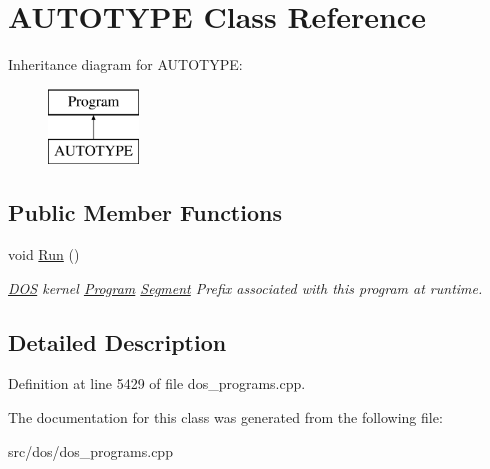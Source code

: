 \hypertarget{classAUTOTYPE}{\section{A\-U\-T\-O\-T\-Y\-P\-E Class Reference}
\label{classAUTOTYPE}
}
Inheritance diagram for A\-U\-T\-O\-T\-Y\-P\-E\-:\begin{figure}[H]
\begin{center}
\leavevmode
\includegraphics[height=2.000000cm]{classAUTOTYPE}
\end{center}
\end{figure}
\subsection*{Public Member Functions}
\begin{DoxyCompactItemize}
\item 
\hypertarget{classAUTOTYPE_ade03e4187cc5748e56631c5370f0c571}{void \hyperlink{classAUTOTYPE_ade03e4187cc5748e56631c5370f0c571}{Run} ()}\label{classAUTOTYPE_ade03e4187cc5748e56631c5370f0c571}

\begin{DoxyCompactList}\small\item\em \hyperlink{classDOS}{D\-O\-S} kernel \hyperlink{classProgram}{Program} \hyperlink{structSegment}{Segment} Prefix associated with this program at runtime. \end{DoxyCompactList}\end{DoxyCompactItemize}


\subsection{Detailed Description}


Definition at line 5429 of file dos\-\_\-programs.\-cpp.



The documentation for this class was generated from the following file\-:\begin{DoxyCompactItemize}
\item 
src/dos/dos\-\_\-programs.\-cpp\end{DoxyCompactItemize}
